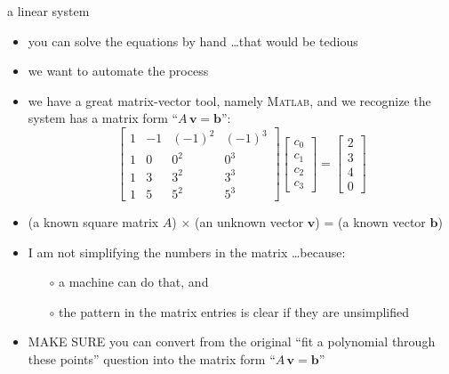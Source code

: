 \documentclass[10pt,hyperref]{beamer}
\newcommand{\bb}{\mathbf{b}}
\newcommand{\bv}{\mathbf{v}}
\newcommand{\Matlab}{\textsc{Matlab}\xspace}
\newcommand{\MO}{\Matlab}
\newcommand{\MS}{\alert{MAKE SURE}\xspace}
\begin{document}
\begin{frame}{a linear system}
\begin{itemize}
\item you can solve the equations by hand \dots that would be tedious
\item we want to automate the process
\item we have a great matrix-vector tool, namely \MO, and we recognize the system has a matrix form ``$A\, \bv = \bb$'':
$$\begin{bmatrix}
1 & -1 & (-1)^2 & (-1)^3 \\
1 & 0 & 0^2 & 0^3 \\
1 & 3 & 3^2 & 3^3 \\
1 & 5 & 5^2 & 5^3
\end{bmatrix}\begin{bmatrix}
c_0 \\ c_1 \\ c_2 \\ c_3
\end{bmatrix}
=
\begin{bmatrix}
2 \\ 3 \\ 4 \\ 0
\end{bmatrix}$$
\item (a known square matrix $A$) $\times$ (an unknown vector $\bv$) = (a known vector $\bb$)
\item I am not simplifying the numbers in the matrix \dots because:
  \begin{itemize}
  \item[$\circ$] a machine can do that, and 
  \item[$\circ$] the pattern in the matrix entries is clear if they are unsimplified
  \end{itemize}
\item \MS you can convert from the original ``fit a polynomial through these points'' question into the matrix form ``$A\, \bv = \bb$''
\end{itemize}
\end{frame}
\end{document}
